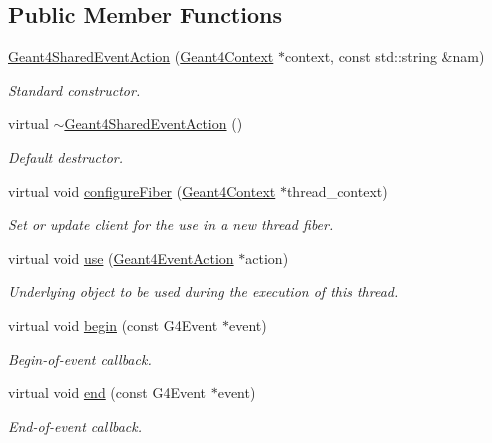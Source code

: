\subsection*{Public Member Functions}
\begin{DoxyCompactItemize}
\item 
\hyperlink{class_d_d4hep_1_1_simulation_1_1_geant4_shared_event_action_a2060121b3b93e2ae9d8680d531a20b9a}{Geant4SharedEventAction} (\hyperlink{class_d_d4hep_1_1_simulation_1_1_geant4_context}{Geant4Context} $\ast$context, const std::string \&nam)
\begin{DoxyCompactList}\small\item\em Standard constructor. \item\end{DoxyCompactList}\item 
virtual \hyperlink{class_d_d4hep_1_1_simulation_1_1_geant4_shared_event_action_a094e353ce282d06dac18c5752c078c63}{$\sim$Geant4SharedEventAction} ()
\begin{DoxyCompactList}\small\item\em Default destructor. \item\end{DoxyCompactList}\item 
virtual void \hyperlink{class_d_d4hep_1_1_simulation_1_1_geant4_shared_event_action_a7933d545b7caacaca3928b3af1038df6}{configureFiber} (\hyperlink{class_d_d4hep_1_1_simulation_1_1_geant4_context}{Geant4Context} $\ast$thread\_\-context)
\begin{DoxyCompactList}\small\item\em Set or update client for the use in a new thread fiber. \item\end{DoxyCompactList}\item 
virtual void \hyperlink{class_d_d4hep_1_1_simulation_1_1_geant4_shared_event_action_a1b553e6983d3ce8bb3a84f660216175b}{use} (\hyperlink{class_d_d4hep_1_1_simulation_1_1_geant4_event_action}{Geant4EventAction} $\ast$action)
\begin{DoxyCompactList}\small\item\em Underlying object to be used during the execution of this thread. \item\end{DoxyCompactList}\item 
virtual void \hyperlink{class_d_d4hep_1_1_simulation_1_1_geant4_shared_event_action_a64b5998713b09c32de56774b1d69f64d}{begin} (const G4Event $\ast$event)
\begin{DoxyCompactList}\small\item\em Begin-\/of-\/event callback. \item\end{DoxyCompactList}\item 
virtual void \hyperlink{class_d_d4hep_1_1_simulation_1_1_geant4_shared_event_action_a207f1882eece3c87364b38b266bd9935}{end} (const G4Event $\ast$event)
\begin{DoxyCompactList}\small\item\em End-\/of-\/event callback. \item\end{DoxyCompactList}\end{DoxyCompactItemize}
